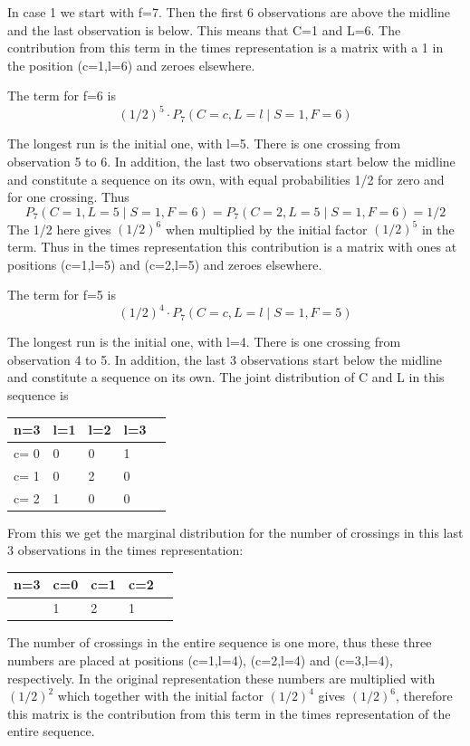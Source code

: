 In case 1 we start with f=7. Then the first 6 observations are above the midline and the last observation is below. This means that C=1 and L=6. The contribution from this term in the times representation is a matrix with a 1 in the position (c=1,l=6) and zeroes elsewhere. 

The term for f=6 is $$(1/2)^5 \cdot   P_7 (C=c, L=l \mid S=1,F=6)$$

The longest run is the initial one, with l=5. There is one crossing from observation 5 to 6. In addition, the last two observations start below the midline and constitute a sequence on its own, with equal probabilities 1/2 for zero and for one crossing. Thus $$P_7 (C=1, L=5 \mid S=1,F=6)=P_7 (C=2, L=5 \mid S=1,F=6)=1/2$$
The 1/2 here gives $(1/2)^6$ when multiplied by the initial factor $(1/2)^5$ in the term. Thus in the times representation this contribution is a matrix with ones at positions (c=1,l=5) and (c=2,l=5) and zeroes elsewhere. 

The term for f=5 is $$(1/2)^4 \cdot   P_7 (C=c, L=l \mid S=1,F=5)$$

The longest run is the initial one, with l=4. There is one crossing from observation 4 to 5. In addition, the last 3 observations start below the midline and constitute a sequence on its own. The joint distribution of C and L in this sequence is 

\begin{tabular}{l | l l l l}
\hline
n=3&l=1&l=2&l=3\\
\hline
c= 0& 0& 0& 1\\
c= 1& 0& 2& 0\\
c= 2& 1& 0& 0\\
\hline
\end{tabular}

From this we get the marginal distribution for the number of crossings in this last 3 observations in the times representation:

\begin{tabular}{l | l l l l}
\hline
n=3&c=0&c=1&c=2\\
\hline
& 1& 2& 1\\
\hline
\end{tabular}


The number of crossings in the entire sequence is one more, thus these three numbers are placed at positions (c=1,l=4), (c=2,l=4) and (c=3,l=4), respectively. In the original representation these numbers are multiplied with $(1/2)^2$ which together with the initial factor $(1/2)^4$ gives $(1/2)^6$, therefore this matrix is the contribution from this term in the times representation of the entire sequence.

